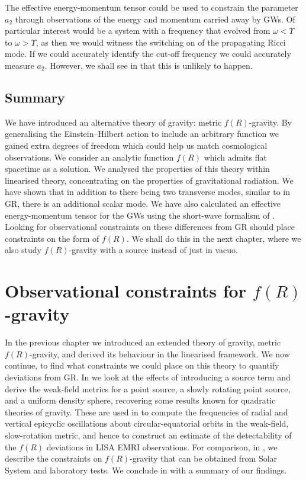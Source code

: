 The effective energy-momentum tensor could be used to constrain the parameter $a_2$ through observations of the energy and momentum carried away by GWs. Of particular interest would be a system with a frequency that evolved from $\omega < \Upsilon$ to $\omega > \Upsilon$, as then we would witness the switching on of the propagating Ricci mode. If we could accurately identify the cut-off frequency we could accurately measure $a_2$. However, we shall see in  that this is unlikely to happen.

\section{Summary}

We have introduced an alternative theory of gravity: metric $f(R)$-gravity. By generalising the Einstein--Hilbert action to include an arbitrary function we gained extra degrees of freedom which could help us match cosmological observations. We consider an analytic function $f(R)$ which admits flat spacetime as a solution. We analysed the properties of this theory within linearised theory, concentrating on the properties of gravitational radiation. We have shown that in addition to there being two transverse modes, similar to in GR, there is an additional scalar mode. We have also calculated an effective energy-momentum tensor for the GWs using the short-wave formalism of \citet{Isaacson1968,Isaacson1968a}. Looking for observational constraints on these differences from GR should place constraints on the form of $f(R)$. We shall do this in the next chapter, where we also study $f(R)$-gravity with a source instead of just in vacuo.


\chapter{Observational constraints for $f(R)$-gravity}\label{ch:f-R2}

In the previous chapter we introduced an extended theory of gravity, metric $f(R)$-gravity, and derived its behaviour in the linearised framework. We now continue, to find what constraints we could place on this theory to quantify deviations from GR. In  we look at the effects of introducing a source term and derive the weak-field metrics for a point source, a slowly rotating point source, and a uniform density sphere, recovering some results known for quadratic theories of gravity. These are used in  to compute the frequencies of radial and vertical epicyclic oscillations about circular-equatorial orbits in the weak-field, slow-rotation metric, and hence to construct an estimate of the detectability of the $f(R)$ deviations in LISA EMRI observations. For comparison, in , we describe the constraints on $f(R)$-gravity that can be obtained from Solar System and laboratory tests. We conclude in  with a summary of our findings.

